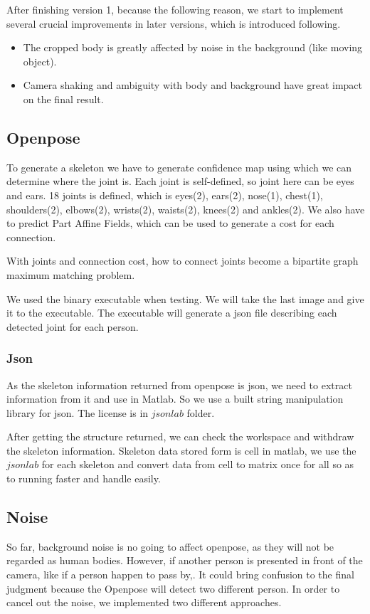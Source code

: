 \documentclass[11pt,twocolumn,letterpaper]{article}
\begin{document}
		\par
		After finishing version 1, because the following reason, we start to implement several crucial improvements in later versions, which is introduced following.
		\begin{itemize}
		\item The cropped body is greatly affected by noise in the background (like moving object). 
		\item Camera shaking and ambiguity with body and background have great impact on the final result.
		\end{itemize}
	\subsection{Openpose\cite{cao2017realtime}}
	    \par To generate a skeleton we have to generate confidence map using which we can determine where the joint is.
		Each joint is self-defined, so joint here can be eyes and ears.
		18 joints is defined, which is eyes(2), ears(2), nose(1), chest(1), shoulders(2), elbows(2), wrists(2), waists(2), knees(2) and ankles(2).
		We also have to predict Part Affine Fields, which can be used to generate a cost for each connection.
		\par With joints and connection cost, how to connect joints become a bipartite graph maximum matching problem.
		\par We used the binary executable\cite{cao2017realtime} when testing. We will take the last image and give it to the executable. The executable will generate a json file describing each detected joint for each person.
	    \subsubsection{Json}
        \par As the skeleton information returned from openpose is json, we need to extract information from it and use in Matlab. So we use a built string manipulation library for json. The license is in $jsonlab$ folder.
        \par After getting the structure returned, we can check the workspace and withdraw the skeleton information. Skeleton data stored form is cell in matlab, we use the $jsonlab$ for each skeleton and convert data from cell to matrix once for all so as to running faster and handle easily.

	\subsection{Noise}
\par
So far, background noise is no going to affect openpose, as they will not be regarded as human bodies. However, if another person is presented in front of the camera, like if a person happen to pass by,. It could bring confusion to the final judgment because the Openpose will detect two different person. In order to cancel out the noise, we implemented two different approaches.
\end{document}
